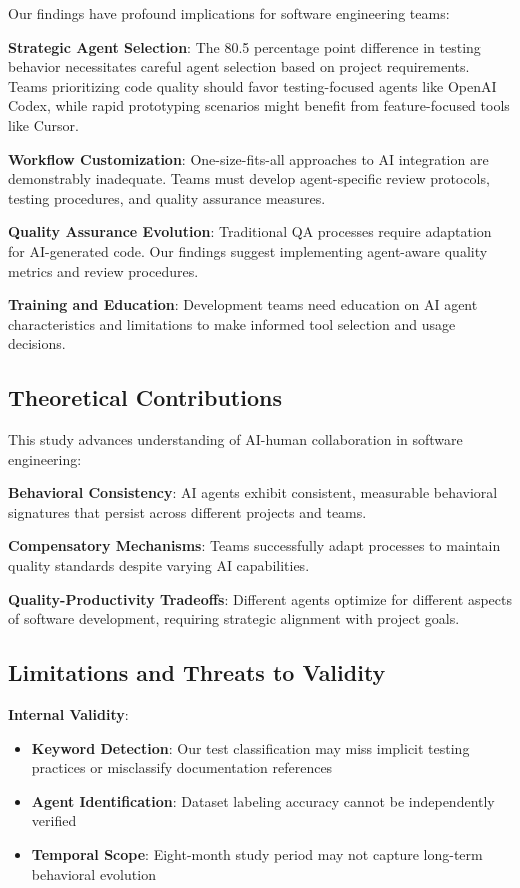 \documentclass[conference]{IEEEtran}
\begin{document}
{Our findings have profound implications for software engineering teams:

\textbf{Strategic Agent Selection}: The 80.5 percentage point difference in testing behavior necessitates careful agent selection based on project requirements. Teams prioritizing code quality should favor testing-focused agents like OpenAI Codex, while rapid prototyping scenarios might benefit from feature-focused tools like Cursor.

\textbf{Workflow Customization}: One-size-fits-all approaches to AI integration are demonstrably inadequate. Teams must develop agent-specific review protocols, testing procedures, and quality assurance measures.

\textbf{Quality Assurance Evolution}: Traditional QA processes require adaptation for AI-generated code. Our findings suggest implementing agent-aware quality metrics and review procedures.

\textbf{Training and Education}: Development teams need education on AI agent characteristics and limitations to make informed tool selection and usage decisions.

\subsection{Theoretical Contributions}

This study advances understanding of AI-human collaboration in software engineering:

\textbf{Behavioral Consistency}: AI agents exhibit consistent, measurable behavioral signatures that persist across different projects and teams.

\textbf{Compensatory Mechanisms}: Teams successfully adapt processes to maintain quality standards despite varying AI capabilities.

\textbf{Quality-Productivity Tradeoffs}: Different agents optimize for different aspects of software development, requiring strategic alignment with project goals.

\subsection{Limitations and Threats to Validity}

\textbf{Internal Validity}:
\begin{itemize}
    \item \textbf{Keyword Detection}: Our test classification may miss implicit testing practices or misclassify documentation references
    \item \textbf{Agent Identification}: Dataset labeling accuracy cannot be independently verified
    \item \textbf{Temporal Scope}: Eight-month study period may not capture long-term behavioral evolution
\end{itemize}

}
\end{document}
